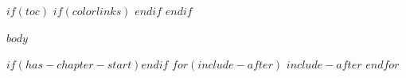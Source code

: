 \documentclass[11pt, a4paper]{article}
\begin{document}
\thispagestyle{firstpage}

$if(toc)$
{
$if(colorlinks)$
\hypersetup{linkcolor=$if(toccolor)$$toccolor$$else$black$endif$}
$endif$
\setcounter{tocdepth}{$toc-depth$}
\tableofcontents
}
\newpage
$endif$

$body$

$if(has-chapter-start)$$endif$
$for(include-after)$
$include-after$
$endfor$
\end{document}
